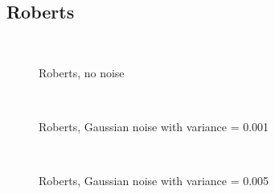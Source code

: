 \documentclass[10pt,a4paper]{article}
\begin{document}
\subsection{Roberts}
\begin{figure}[H]
  \centering
     \\
  \caption{Roberts, no noise}
  \label{fig:robert_no_noise}
\end{figure}
\begin{figure}[H]
  \centering
     \\
  \caption{Roberts, Gaussian noise with variance = 0.001}
  \label{fig:robert_001}
\end{figure}
\begin{figure}[H]
  \centering
     \\
  \caption{Roberts, Gaussian noise with variance = 0.005}
  \label{fig:robert_005}
\end{figure}
\end{document}
